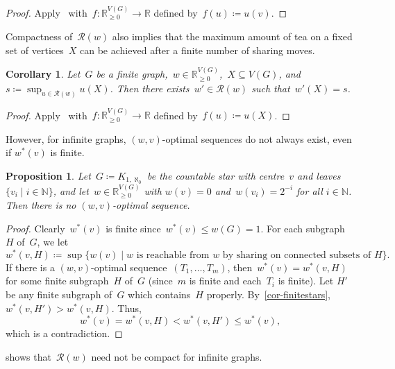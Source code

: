 \documentclass[reqno, 12pt]{amsart}
\numberwithin{equation}{section}
\numberwithin{figure}{section}
\theoremstyle{plain}
\newtheorem{corollary}[thm]{Corollary}
\newtheorem{prop}[thm]{Proposition}
\theoremstyle{definition}
\newcommand*{\weights}{\ensuremath{\mathbb{R}_{\geq 0}^{V(G)}}}
\begin{document}
\begin{proof}
    Apply~ with~${f \colon \weights \to \mathbb{R}}$ defined by~${f(u) \coloneqq u(v)}$.
\end{proof}

Compactness of~${\mathcal{R}(w)}$ also implies that  the maximum amount of tea on a fixed set of vertices~$X$ can be achieved after a finite number of sharing moves.  

\begin{corollary}
    Let~$G$ be a finite graph,~${w \in \weights}$,~${X \subseteq V(G)}$, and~${s \coloneqq \sup_{u \in \mathcal{R}(w)} u(X)}$.  
    Then there exists~${w' \in \mathcal{R}(w)}$ such that~${w'(X) = s}$. 
\end{corollary}

\begin{proof}
        Apply~ with~${f \colon \weights \to \mathbb{R}}$ defined by~${f(u) \coloneqq u(X)}$.
\end{proof}


However, for infinite graphs, ${(w,v)}$-optimal sequences do not always exist, even if $w^*(v)$ is finite.  

\begin{prop}
    \label{prop:infinitestar}
    Let~${G \coloneqq K_{1,\aleph_0}}$ be the countable star with centre~$v$ and leaves~${\{ v_i \mid i \in \mathbb{N} \}}$, and let~${w \in \weights}$ with ${w(v) = 0}$ and~${w(v_i) = 2^{-i}}$ for all $i \in \mathbb{N}$. 
    Then there is no $(w, v)$-optimal sequence.
\end{prop}

\begin{proof}
    Clearly~$w^*(v)$ is finite since~${w^*(v) \leq w(G) = 1}$. 
    For each subgraph~$H$ of~$G$, we let 
    \[
        w^*(v,H) \coloneqq \sup \{ w(v) \mid \text{$w$ is reachable from $w$ by sharing on connected subsets of $H$} \}. 
    \]
    If there is a ${(w, v)}$-optimal sequence~${(T_1, \dots, T_m)}$, then~${w^*(v) = w^*(v,H)}$ for some finite subgraph~$H$ of~$G$ (since~$m$ is finite and each~$T_i$ is finite). Let $H'$ be any finite subgraph of~$G$ which contains~$H$ properly. 
    By~\cref{cor-finitestars}, ${w^*(v, H') > w^*(v,H)}$.
    Thus,
    \[
        w^*(v) = w^*(v, H) < w^*(v, H') \leq w^*(v),
    \]
    which is a contradiction.  
\end{proof}

 shows that~$\mathcal{R}(w)$ need not be compact for infinite graphs.   
\end{document}
